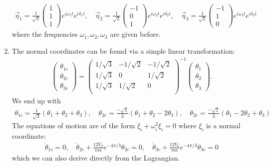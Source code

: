 \documentclass{article}
\theoremstyle{definition}
\newcommand{\f}[2]{\frac{#1}{#2}}
\begin{document}
\begin{enumerate}[label=(\alph*)]
\begin{align*}
	\boxed{\vec{\eta}_1 = \f{1}{\sqrt{3}}\begin{pmatrix}
	1\\1\\1
	\end{pmatrix}e^{i\omega_1 t}e^{i\delta_1 t}, \quad \vec{\eta}_2= \f{1}{\sqrt{2}}\begin{pmatrix}
	-1\\0\\1
	\end{pmatrix}e^{i\omega_2 t} e^{i\delta_2 t}, 
	\quad \vec{\eta}_3 = \f{1}{\sqrt{2}}\begin{pmatrix}
	-1\\1\\0
	\end{pmatrix}e^{i\omega_3 t} e^{i\delta_3 t}} 
	\end{align*}
	where the frequencies $\omega_1,\omega_2,\omega_3$ are given before.
	
	\item The normal coordinates can be found via a simple linear transformation:
	\begin{align*}
	\begin{pmatrix}
	\theta_{1c} \\ \theta_{2c} \\ \theta_{3c}
	\end{pmatrix}
	= 
	\begin{pmatrix}
	1/\sqrt{3} & -1/\sqrt{2} & -1/\sqrt{2} \\
	1/\sqrt{3} & 0 & 1/\sqrt{2} \\
	1/\sqrt{3} & 1/\sqrt{2} & 0 \\
	\end{pmatrix}^{-1}
	\begin{pmatrix}
	\theta_1\\ \theta_2 \\ \theta_3 
	\end{pmatrix}.
	\end{align*}
	We end up with
	\begin{align*}
	\boxed{\theta_{1c} = \f{1}{\sqrt{3}}(\theta_1+\theta_2 + \theta_3), \quad \theta_{2c}= \f{-\sqrt{2}}{3}(\theta_1+\theta_2 - 2\theta_3), \quad \theta_{2c}= \f{-\sqrt{2}}{3}(\theta_1- 2\theta_2 +\theta_3)}
	\end{align*}
	The equations of motion are of the form $\ddot \xi_i + \omega^2_i \xi_i = 0$ where $\xi_i$ is a normal coordinate:
	\begin{align*}
	\boxed{\ddot\theta_{1c} = 0, \quad \ddot\theta_{2c} + \f{12V_0}{ma}e^{-4\pi/3} \theta_{2c} = 0, \quad 
	\ddot\theta_{3c} + \f{12V_0}{ma}e^{-4\pi/3} \theta_{3c} = 0}
	\end{align*}
	which we can also derive directly from the Lagrangian.
	

\end{enumerate}
\end{document}
